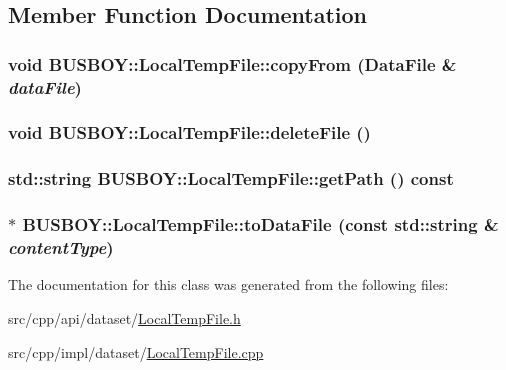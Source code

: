 \subsection{Member Function Documentation}
\hypertarget{classBUSBOY_1_1LocalTempFile_aa13b601ef9fde5f7169ba003eb337ed2}{
\subsubsection[{copyFrom}]{\setlength{\rightskip}{0pt plus 5cm}void BUSBOY::LocalTempFile::copyFrom ({\bf DataFile} \& {\em dataFile})}}
\label{classBUSBOY_1_1LocalTempFile_aa13b601ef9fde5f7169ba003eb337ed2}
\hypertarget{classBUSBOY_1_1LocalTempFile_a5d74e86bea956ab03c76913a3e47c926}{
\subsubsection[{deleteFile}]{\setlength{\rightskip}{0pt plus 5cm}void BUSBOY::LocalTempFile::deleteFile ()}}
\label{classBUSBOY_1_1LocalTempFile_a5d74e86bea956ab03c76913a3e47c926}
\hypertarget{classBUSBOY_1_1LocalTempFile_a8556dfd1ac7d544a40885f56beeedd4a}{
\subsubsection[{getPath}]{\setlength{\rightskip}{0pt plus 5cm}std::string BUSBOY::LocalTempFile::getPath () const}}
\label{classBUSBOY_1_1LocalTempFile_a8556dfd1ac7d544a40885f56beeedd4a}
\hypertarget{classBUSBOY_1_1LocalTempFile_afd98e9e11188217a26a95ca2c723a14e}{
\subsubsection[{toDataFile}]{ $\ast$ BUSBOY::LocalTempFile::toDataFile (const std::string \& {\em contentType})}}
\label{classBUSBOY_1_1LocalTempFile_afd98e9e11188217a26a95ca2c723a14e}


The documentation for this class was generated from the following files:\begin{DoxyCompactItemize}
\item 
src/cpp/api/dataset/\hyperlink{LocalTempFile_8h}{LocalTempFile.h}\item 
src/cpp/impl/dataset/\hyperlink{LocalTempFile_8cpp}{LocalTempFile.cpp}\end{DoxyCompactItemize}
